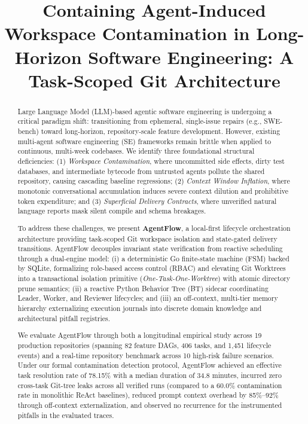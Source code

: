 \documentclass[conference]{IEEEtran}
\begin{document}
\title{Containing Agent-Induced Workspace Contamination in Long-Horizon Software Engineering: A Task-Scoped Git Architecture}

\author{
}

\maketitle

\begin{abstract}
Large Language Model (LLM)-based agentic software engineering is undergoing a critical paradigm shift: transitioning from ephemeral, single-issue repairs (e.g., SWE-bench) toward long-horizon, repository-scale feature development. However, existing multi-agent software engineering (SE) frameworks remain brittle when applied to continuous, multi-week codebases. We identify three foundational structural deficiencies: (1) \textit{Workspace Contamination}, where uncommitted side effects, dirty test databases, and intermediate bytecode from untrusted agents pollute the shared repository, causing cascading baseline regressions; (2) \textit{Context Window Inflation}, where monotonic conversational accumulation induces severe context dilution and prohibitive token expenditure; and (3) \textit{Superficial Delivery Contracts}, where unverified natural language reports mask silent compile and schema breakages.

To address these challenges, we present \textbf{AgentFlow}, a local-first lifecycle orchestration architecture providing task-scoped Git workspace isolation and state-gated delivery transitions. AgentFlow decouples invariant state verification from reactive scheduling through a dual-engine model:
(i) a deterministic Go finite-state machine (FSM) backed by SQLite, formalizing role-based access control (RBAC) and elevating Git Worktrees into a transactional isolation primitive (\textit{One-Task-One-Worktree}) with atomic directory prune semantics;
(ii) a reactive Python Behavior Tree (BT) sidecar coordinating Leader, Worker, and Reviewer lifecycles; and
(iii) an off-context, multi-tier memory hierarchy externalizing execution journals into discrete domain knowledge and architectural pitfall registries.

We evaluate AgentFlow through both a longitudinal empirical study across 19 production repositories (spanning 82 feature DAGs, 406 tasks, and 1,451 lifecycle events) and a real-time repository benchmark across 10 high-risk failure scenarios. Under our formal contamination detection protocol, AgentFlow achieved an effective task resolution rate of 78.15\% with a median duration of 34.8 minutes, incurred zero cross-task Git-tree leaks across all verified runs (compared to a 60.0\% contamination rate in monolithic ReAct baselines), reduced prompt context overhead by 85\%--92\% through off-context externalization, and observed no recurrence for the instrumented pitfalls in the evaluated traces.
\end{abstract}
\end{document}
